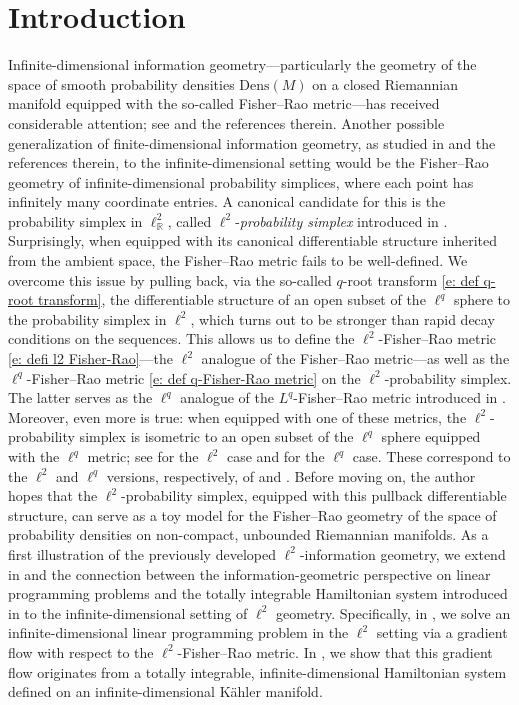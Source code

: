 \documentclass[runningheads]{llncs}
\begin{document}
\section{Introduction}\label{sec:introduction}
Infinite-dimensional information geometry—particularly the geometry of the space of smooth probability densities $\mathrm{Dens}(M)$ on a closed Riemannian manifold equipped with the so-called Fisher--Rao metric—has received considerable attention; see \cite{FisherRaoisunique,bauerLpFisherRaoMetricAmari2024,khesin_GAFA,khesin_geometry_2019} and the references therein. Another possible generalization of finite-dimensional information geometry, as studied in \cite{MR1800071,InfGeo_book} and the references therein, to the infinite-dimensional setting would be the Fisher--Rao geometry of infinite-dimensional probability simplices, where each point has infinitely many coordinate entries. A canonical candidate for this is the probability simplex in $\ell^2_{\mathbb{R}}$, called $\ell^2$-\emph{probability simplex} introduced in . Surprisingly, when equipped with its canonical differentiable structure inherited from the ambient space, the Fisher--Rao metric  fails to be well-defined. We overcome this issue by pulling back, via the so-called $q$-root transform \eqref{e: def q-root transform}, the differentiable structure of an open subset of the $\ell^q$ sphere to the probability simplex in $\ell^2$, which turns out to be stronger than rapid decay conditions on the sequences. This allows us to define the $\ell^2$-Fisher--Rao metric \eqref{e: defi l2 Fisher-Rao}—the $\ell^2$ analogue of the Fisher--Rao metric—as well as the $\ell^q$-Fisher--Rao metric \eqref{e: def q-Fisher-Rao metric} on the $\ell^2$-probability simplex. The latter serves as the $\ell^q$ analogue of the $L^q$-Fisher--Rao metric introduced in \cite{bauerLpFisherRaoMetricAmari2024}. 
Moreover, even more is true: when equipped with one of these metrics, the $\ell^2$-probability simplex is isometric to an open subset of the $\ell^q$ sphere equipped with the $\ell^q$ metric; see  for the $\ell^2$ case and  for the $\ell^q$ case. These correspond to the $\ell^2$ and $\ell^q$ versions, respectively, of \cite[Thm.~3.1]{khesin_GAFA} and \cite[Thm.~4.10]{bauerLpFisherRaoMetricAmari2024}. Before moving on, the author hopes that the $\ell^2$-probability simplex, equipped with this pullback differentiable structure, can serve as a toy model for the Fisher--Rao geometry of the space of probability densities on non-compact, unbounded Riemannian manifolds.
As a first illustration of the previously developed $\ell^2$-information geometry, we extend in  and  the connection between the information-geometric perspective on linear programming problems and the totally integrable Hamiltonian system introduced in \cite{faybusovich_hamiltonian_1991} to the infinite-dimensional setting of $\ell^2$ geometry. Specifically, in , we solve an infinite-dimensional linear programming problem in the $\ell^2$ setting via a gradient flow with respect to the $\ell^2$-Fisher–Rao metric. In , we show that this gradient flow originates from a totally integrable, infinite-dimensional Hamiltonian system defined on an infinite-dimensional Kähler manifold. 
\end{document}

